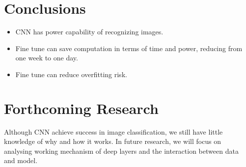 \documentclass[a0,portrait]{a0poster}
\begin{document}
\begin{multicols}{2}

\section*{Conclusions}

\begin{itemize}
\item CNN has power capability of recognizing images.
\item Fine tune can save computation in terms of time and power, reducing from one week to one day.
\item Fine tune can reduce overfitting risk. 
\end{itemize}



\section*{Forthcoming Research}

Although CNN achieve success in image classification, we still have little knowledge of why and how it works. In future research, we will focus on analysing working mechanism of deep layers and the interaction between data and model.




\end{multicols}
\end{document}

